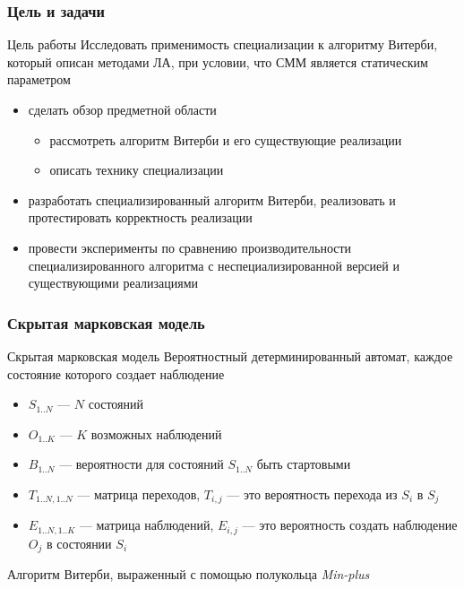 \documentclass{beamer}
\begin{document}
\begin{frame}[fragile]
	\frametitle{Цель и задачи}
	\begin{block}{Цель работы}
		Исследовать применимость специализации к алгоритму Витерби, который описан методами ЛА,
при условии, что СММ является статическим параметром
	\end{block}
	\vfill
\begin{itemize}
	\item сделать обзор предметной области
		\begin{itemize}
			\item рассмотреть алгоритм Витерби и его существующие реализации
			\item описать технику специализации
		\end{itemize}
	\item разработать специализированный алгоритм Витерби, реализовать и протестировать корректность реализации
	\item провести эксперименты по сравнению производительности специализированного алгоритма с неспециализированной версией и существующими реализациями
\end{itemize}
\end{frame}

\begin{frame}[fragile]
	\frametitle{Скрытая марковская модель}
	\begin{block}{Скрытая марковская модель}
		Вероятностный детерминированный автомат, каждое состояние которого создает наблюдение
		\begin{itemize}
			\item $\mathit{S_{1..N}}$ --- $N$ состояний
			\item $\mathit{O_{1..K}}$ --- $K$ возможных наблюдений
			\item $\mathit{B_{1..N}}$ --- вероятности для состояний $\mathit{S_{1..N}}$ быть стартовыми 
			\item $\mathit{T_{1..N, 1..N}}$ --- матрица переходов, $\mathit{T_{i,j}}$ --- это вероятность перехода из $\mathit{S_{i}}$ в $\mathit{S_{j}}$
			\item $\mathit{E_{1..N, 1..K}}$ --- матрица наблюдений, $\mathit{E_{i,j}}$ --- это вероятность создать наблюдение 
$\mathit{O_{j}}$ в состоянии $\mathit{S_{i}}$
		\end{itemize}
	\end{block}
	\vfill
Алгоритм Витерби, выраженный с помощью полукольца \emph{Min-plus}
\end{frame}
\end{document}
